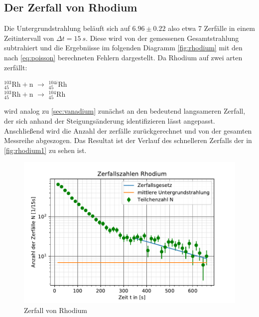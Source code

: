 \subsection{Der Zerfall von Rhodium}
Die Untergrundstrahlung beläuft sich auf  $6.96 \pm 0.22$ also etwa 7 Zerfälle in einem Zeitintervall
von $\Delta t =\SI{15}{s}$. Diese wird von der gemessenen Gesamtstrahlung subtrahiert und die Ergebniisse
im folgenden Diagramm \autoref{fig:rhodium} mit den nach \autoref{eq:poisson} berechneten Fehlern dargestellt.
Da Rhodium auf zwei arten zerfällt: 
\begin{center} 
    $^{103}_{45}\mathrm{Rh} + \mathrm{n}$ $\rightarrow$ $^{104i}_{45}\mathrm{Rh}$\\
    $^{103}_{45}\mathrm{Rh} + \mathrm{n}$ $\rightarrow$ $^{104}_{45}\mathrm{Rh}$
\end{center}
wird analog zu \autoref{sec:vanadium} zunächst an den bedeutend langsameren Zerfall, der sich anhand der 
Steigungsänderung identifizieren lässt angepasst. Anschließend wird die Anzahl der zerfälle zurückgerechnet und 
von der gesamten Messreihe abgeszogen. Das Resultat ist der Verlauf des schnelleren Zerfalls der in 
\autoref{fig:rhodium1} zu sehen ist. 
  \begin{figure}
    \centering
    \includegraphics{rhodium.pdf}
    \caption{Zerfall von Rhodium}
    
  \end{figure}

